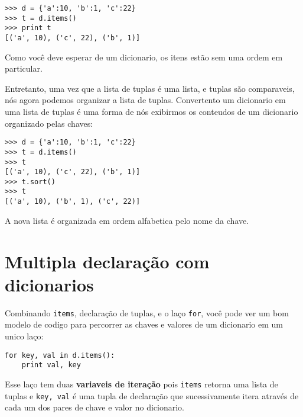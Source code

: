 \beforeverb
\begin{verbatim}
>>> d = {'a':10, 'b':1, 'c':22}
>>> t = d.items()
>>> print t
[('a', 10), ('c', 22), ('b', 1)]
\end{verbatim}
\afterverb
%
Como você deve esperar de um dicionario, os itens estão sem
uma ordem em particular.

Entretanto, uma vez que a lista de tuplas é uma lista, e tuplas são comparaveis,
nós agora podemos organizar a lista de tuplas. Convertento um dicionario
em uma lista de tuplas é uma forma de nós exibirmos os conteudos de um
dicionario organizado pelas chaves:

\beforeverb
\begin{verbatim}
>>> d = {'a':10, 'b':1, 'c':22}
>>> t = d.items()
>>> t
[('a', 10), ('c', 22), ('b', 1)]
>>> t.sort()
>>> t
[('a', 10), ('b', 1), ('c', 22)]
\end{verbatim}
\afterverb
%
A nova lista é organizada em ordem alfabetica pelo nome da chave.

\section{Multipla declaração com dicionarios}


Combinando {\tt items}, declaração de tuplas, e o laço {\tt for}, você
pode ver um bom modelo de codigo para percorrer as chaves e valores de um
dicionario em um unico laço:

\beforeverb
\begin{verbatim}
for key, val in d.items():
    print val, key
\end{verbatim}
\afterverb
%
Esse laço tem duas {\bf variaveis de iteração} pois {\tt items} retorna
uma lista de tuplas e {\tt key, val} é uma tupla de declaração
que sucessivamente itera através de cada um dos pares de chave e valor no
dicionario.


